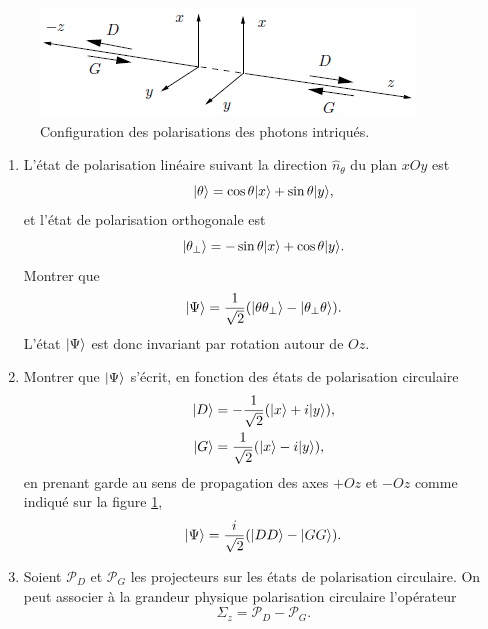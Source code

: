 \begin{figure}[ptbh]
\centering
	\includegraphics[scale=1]{graphics/ExoInegalitesBell.jpg}
	\caption{Configuration des polarisations des photons intriqués.}
	\label{fig:ExoInegalitesBell}
\end{figure}

\begin{enumerate}
\item L'état de polarisation linéaire suivant la direction $\hat{n}_{\theta}$
du plan $xOy$ est%
\begin{equation}
\vert\theta\rangle=\cos\theta\vert x\rangle+\sin\theta\vert y\rangle,
\end{equation}
et l'état de polarisation orthogonale est
\begin{equation}
\vert\theta_{\bot}\rangle=-\sin\theta\vert x\rangle+\cos\theta\vert y\rangle.
\end{equation}
Montrer que%
\begin{equation}
\vert\Psi\rangle=\frac{1}{\sqrt{2}}(\vert\theta\theta_{\bot}\rangle-\vert\theta_{\bot}
\theta\rangle).
\end{equation}
L'état $\vert\Psi\rangle$ est donc invariant par rotation autour de $Oz$.

\item Montrer que $\vert\Psi\rangle$ s'écrit, en fonction des états de polarisation
circulaire%
\begin{subequations}
\begin{align}
\vert D\rangle&  =-\frac{1}{\sqrt{2}}(\vert x\rangle+i\vert y\rangle),\\
\vert G\rangle&  =\frac{1}{\sqrt{2}}(\vert x\rangle-i\vert y\rangle),
\end{align}%
\end{subequations}%
en prenant garde au sens de propagation des axes $+Oz$ et $-Oz$ comme indiqué
sur la figure \ref{fig:ExoInegalitesBell},
\begin{equation}
 \ket{\Psi}=\frac{i}{\sqrt{2}}(\ket{DD}-\ket{GG}).
\label{eq:VectDDGG}%
\end{equation}

\item Soient $\mathcal{P}_{D}$ et $\mathcal{P}_{G}$ les projecteurs sur les
états de polarisation circulaire. On peut associer à la grandeur physique
polarisation circulaire l'opérateur
\begin{equation}
\Sigma_{z}=\mathcal{P}_{D}-\mathcal{P}_{G}.
\label{eq:OpPolCirc}%
\end{equation}


\end{enumerate}
